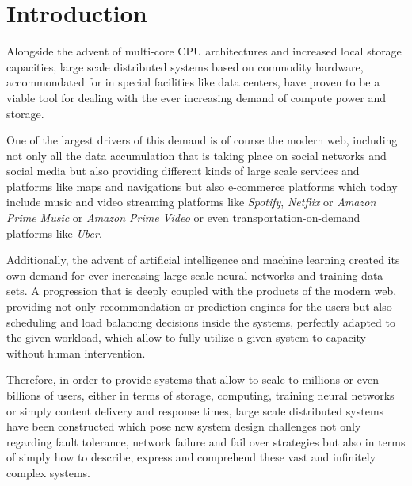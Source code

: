 \section{Introduction}
Alongside the advent of multi-core CPU architectures
and increased local storage capacities, large scale distributed
systems based on commodity hardware, accommondated for in special
facilities like data centers, have proven to be a viable tool for
dealing with the ever increasing demand of compute power and
storage.

One of the largest drivers of this demand is of course
the modern web, including not only all the data accumulation
that is taking place on social networks and social media but also
providing different kinds of large scale services and platforms
like maps and navigations but also e-commerce platforms which
today include music and video streaming platforms like
\textit{Spotify}, \textit{Netflix} or \textit{Amazon Prime Music} or
\textit{Amazon Prime Video} or even transportation-on-demand
platforms like \textit{Uber}.

Additionally, the advent of artificial intelligence and
machine learning created its own demand for ever increasing
large scale neural networks and training data sets. A progression
that is deeply coupled with the products of the modern web,
providing not only recommondation or prediction engines for
the users but also scheduling and load balancing decisions
inside the systems, perfectly adapted to the given workload,
which allow to fully utilize a given system to capacity without
human intervention.
\newline

Therefore, in order to provide systems that allow to scale to millions
or even billions of users, either in terms of storage, computing,
training neural networks or simply content delivery and response times,
large scale distributed systems have been constructed which pose new
system design challenges not only regarding fault tolerance, network failure
and fail over strategies but also in terms of simply how to
describe, express and comprehend these vast and infinitely
complex systems.







